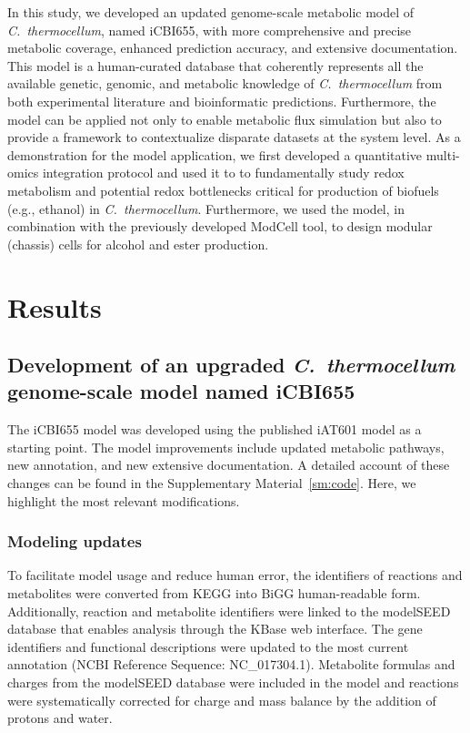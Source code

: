 In this study, we developed an updated genome-scale metabolic model of \textit{C.~thermocellum}, named iCBI655, with more comprehensive and precise metabolic coverage, enhanced prediction accuracy, and extensive documentation. This model is a human-curated database that coherently represents all the available genetic, genomic, and metabolic knowledge of \textit{C.~thermocellum} from both experimental literature and bioinformatic predictions. Furthermore, the model can be applied not only to enable metabolic flux simulation but also to provide a framework to contextualize disparate datasets at the system level. As a demonstration for the model application, we first developed a quantitative multi-omics integration protocol and used it to to fundamentally study redox metabolism and  potential  redox  bottlenecks  critical  for  production  of  biofuels  (e.g.,  ethanol)  in \textit{C.~thermocellum}. Furthermore, we used the model, in combination with the previously developed ModCell tool, \citep{garcia2019,garcia2020b} to design modular (chassis) cells\citep{garcia2019b} for alcohol and ester production.

\section{Results}
\subsection{Development of an upgraded \textit{C.~thermocellum} genome-scale model named iCBI655}
The iCBI655 model was developed using the published iAT601 model\citep{thompson2016} as a starting point. The model improvements include updated metabolic pathways, new annotation, and new extensive documentation.
A detailed account of these changes can be found in the Supplementary Material~\ref{sm:code}. Here, we highlight the most relevant modifications.

\subsubsection{Modeling updates}
To facilitate model usage and reduce human error, the identifiers of reactions and metabolites were converted from KEGG into BiGG human-readable form.\citep{king2015}
Additionally, reaction and metabolite identifiers were linked to the modelSEED database \citep{henry2010} that enables analysis through the KBase web interface.\citep{arkin2018}
The gene identifiers and functional descriptions were updated to the most current annotation (NCBI Reference Sequence: NC\_017304.1). %
Metabolite formulas and charges from the modelSEED database\citep{henry2010} were included in the model and reactions were systematically corrected for charge and mass balance by the addition of protons and water.


